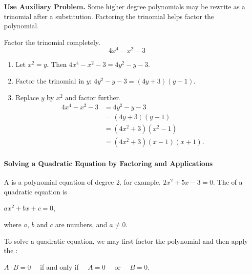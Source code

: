\begin{trick}
	\textbf{Use Auxiliary Problem.} 	Some higher degree polynomials may be rewrite as a trinomial after a  substitution. Factoring the trinomial helps factor the polynomial.
\end{trick}

	\begin{example}
		Factor the trinomial completely.
		\[4x^4-x^2-3\]
	\end{example}
	\vspace*{-0.5\baselineskip}
	\begin{solution}
		\begin{enumerate}[label={\textbf{\textup{Step \arabic*.}}~}]
			\item Let $x^2=y$. Then $4x^4-x^2-3=4y^2-y-3$.
			\item Factor the trinomial in $y$:   $4y^2-y-3=(4y+3)(y-1)$.
			\item Replace $y$ by $x^2$ and factor further.
			      \[
				      \begin{split}
					      4x^4-x^2-3&=4y^2-y-3\\
					      &=(4y+3)(y-1)\\
					      &=(4x^2+3)(x^2-1)\\
					      &=(4x^2+3)(x-1)(x+1).
				      \end{split}
			      \]
		\end{enumerate}
	\end{solution}

\vfill\null

\newpage

\paragraph*{Solving a Quadratic Equation by Factoring and Applications}
	A  is a polynomial equation of degree $2$, for example,  $2x^2+5x-3=0$. The  of a quadratic equation is \\
	\centerline{$a x^2+bx+c=0$,}
	where $a$, $b$ and $c$ are numbers, and $a\neq 0$.

	To solve a quadratic equation, we may first factor the polynomial and then apply the : \\
	\centerline{$A\cdot B=0$ \quad ~~if and only if~~  \quad $A=0$ ~~or~~ $B=0$.}

